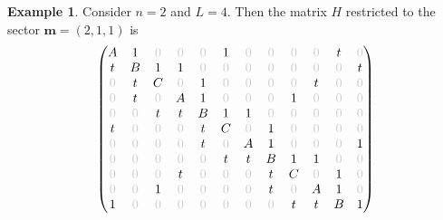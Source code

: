 \documentclass[11pt]{article}
\theoremstyle{definition}
\newtheorem{exam}[theo]{Example}
\numberwithin{equation}{section}
\newcommand{\mm}{\mathbf{m}}
\begin{document}
\begin{exam}
\label{ex:markov_matrix}
Consider $n = 2$ and $L = 4$.
Then the matrix $H$ restricted to the sector $\mm = (2,1,1)$ is
\[
\setcounter{MaxMatrixCols}{20}
\begin{pmatrix}
A & 1 & {\color{black!20}0} & {\color{black!20}0} & {\color{black!20}0} & 1 & {\color{black!20}0} & {\color{black!20}0} & {\color{black!20}0} & {\color{black!20}0} & t & {\color{black!20}0}  \\
t & B & 1 & 1 & {\color{black!20}0} & {\color{black!20}0} & {\color{black!20}0} & {\color{black!20}0} & {\color{black!20}0} & {\color{black!20}0} & {\color{black!20}0} & t \\
{\color{black!20}0} & t & C & {\color{black!20}0} & 1 & {\color{black!20}0} & {\color{black!20}0} & {\color{black!20}0} & {\color{black!20}0} & t & {\color{black!20}0} & {\color{black!20}0} \\
{\color{black!20}0} & t & {\color{black!20}0} & A & 1 & {\color{black!20}0} & {\color{black!20}0} & {\color{black!20}0} & 1 & {\color{black!20}0} & {\color{black!20}0} & {\color{black!20}0} \\
{\color{black!20}0} & {\color{black!20}0} & t & t & B & 1 & 1 & {\color{black!20}0} & {\color{black!20}0} & {\color{black!20}0} & {\color{black!20}0} & {\color{black!20}0} \\
t & {\color{black!20}0} & {\color{black!20}0} & {\color{black!20}0} & t & C & {\color{black!20}0} & 1 & {\color{black!20}0} & {\color{black!20}0} & {\color{black!20}0} & {\color{black!20}0} \\
{\color{black!20}0} & {\color{black!20}0} & {\color{black!20}0} & {\color{black!20}0} & t & {\color{black!20}0} & A & 1 & {\color{black!20}0} & {\color{black!20}0} & {\color{black!20}0} & 1 \\
{\color{black!20}0} & {\color{black!20}0} & {\color{black!20}0} & {\color{black!20}0} & {\color{black!20}0} & t & t & B & 1 & 1 & {\color{black!20}0} & {\color{black!20}0} \\
{\color{black!20}0} & {\color{black!20}0} & {\color{black!20}0} & t & {\color{black!20}0} & {\color{black!20}0} & {\color{black!20}0} & t & C & {\color{black!20}0} & 1 & {\color{black!20}0} \\
{\color{black!20}0} & {\color{black!20}0} & 1 & {\color{black!20}0} & {\color{black!20}0} & {\color{black!20}0} & {\color{black!20}0} & t & {\color{black!20}0} & A & 1 & {\color{black!20}0} \\
1 & {\color{black!20}0} & {\color{black!20}0} & {\color{black!20}0} & {\color{black!20}0} & {\color{black!20}0} & {\color{black!20}0} & {\color{black!20}0} & t & t & B & 1 \\

\end{pmatrix}\]
\end{exam}
\end{document}
